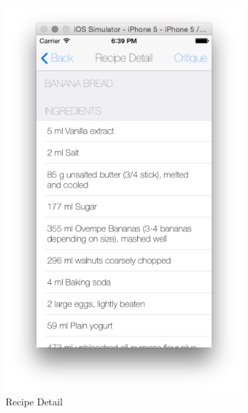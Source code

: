 \begin{figure}[h]
\begin{subfigure}{.32\textwidth}
	  		\includegraphics[width=.9\linewidth]{figures/ch4_app_screen_shots/test_system/evaluation_recipe_detail}
	  		\caption{Recipe Detail}
	  	\end{subfigure}
	  	\begin{subfigure}{.32\textwidth}

\end{subfigure}
\end{figure}
